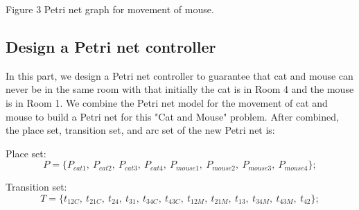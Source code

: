 \documentclass[11pt]{article}
\begin{document}
\begin{flushleft}
\begin{center}
	Figure 3 Petri net graph for movement of mouse.
	\end{center}
	
	\newpage
	\subsection{Design a Petri net controller}
	
	In this part, we design a Petri net controller to guarantee that cat and mouse can never be in the same room with that initially the cat is in Room 4 and the mouse is in Room 1. We combine the Petri net model for the movement of cat and mouse to build a Petri net for this "Cat and Mouse" problem. After combined, the place set, transition set, and arc set of the new Petri net is:
	
	Place set:$$P=\{P_{cat1},\ P_{cat2},\ P_{cat3},\ P_{cat4},\ P_{mouse1},\ P_{mouse2},\ P_{mouse3},\ P_{mouse4}\};$$
	
	Transition set:$$T=\{t_{12C},\ t_{21C},\ t_{24},\ t_{31},\  t_{34C},\ t_{43C},\ t_{12M},\ t_{21M},\ t_{13},\ t_{34M},\  t_{43M},\ t_{42}\};$$
	

\end{flushleft}
\end{document}
